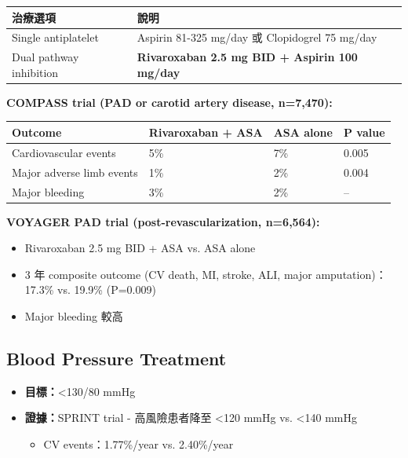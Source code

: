 \documentclass[12pt,a4paper]{article}
\begin{document}
\begin{longtable}{p{4cm}p{10cm}}
\toprule
\textbf{治療選項} & \textbf{說明} \\
\midrule
\endfirsthead
Single antiplatelet & Aspirin 81-325 mg/day 或 Clopidogrel 75 mg/day \\
\midrule
Dual pathway inhibition & \textbf{Rivaroxaban 2.5 mg BID + Aspirin 100 mg/day} \\
\bottomrule
\end{longtable}

\textbf{COMPASS trial (PAD or carotid artery disease, n=7,470):}

\begin{center}
\begin{tabular}{p{5cm}p{3cm}p{3cm}p{2cm}}
\toprule
\textbf{Outcome} & \textbf{Rivaroxaban + ASA} & \textbf{ASA alone} & \textbf{P value} \\
\midrule
Cardiovascular events & 5\% & 7\% & 0.005 \\
Major adverse limb events & 1\% & 2\% & 0.004 \\
Major bleeding & 3\% & 2\% & -- \\
\bottomrule
\end{tabular}
\end{center}

\textbf{VOYAGER PAD trial (post-revascularization, n=6,564):}
\begin{itemize}[leftmargin=2em]
    \item Rivaroxaban 2.5 mg BID + ASA vs. ASA alone
    \item 3 年 composite outcome (CV death, MI, stroke, ALI, major amputation)：17.3\% vs. 19.9\% (P=0.009)
    \item Major bleeding 較高
\end{itemize}

\subsection{Blood Pressure Treatment}

\begin{itemize}[leftmargin=2em]
    \item \textbf{目標：}<130/80 mmHg
    \item \textbf{證據：}SPRINT trial - 高風險患者降至 <120 mmHg vs. <140 mmHg
    \begin{itemize}
        \item CV events：1.77\%/year vs. 2.40\%/year
    \end{itemize}
\end{itemize}
\end{document}
